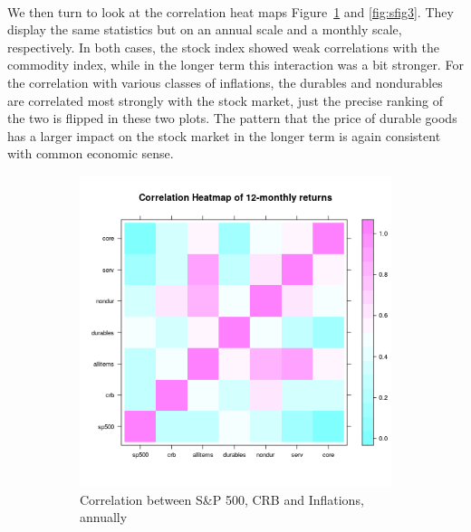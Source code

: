 \documentclass{article}
\begin{document}
\

We then turn to look at the correlation heat maps Figure~\ref{fig:sfig1} and \ref{fig:sfig3}. They display the same statistics but on an annual scale and a monthly scale, respectively. In both cases, the stock index showed weak correlations with the commodity index, while in the longer term this interaction was a bit stronger. For the correlation with various classes of inflations, the durables and nondurables are correlated most strongly with the stock market, just the precise ranking of the two is flipped in these two plots. The pattern that the price of durable goods has a larger impact on the stock market in the longer term is again consistent with common economic sense.

\begin{figure}[h!]
\begin{subfigure}{0.33\textwidth}
  \centering
  \includegraphics[width=\linewidth]{../../figures/heatmapsp500.png}
  \caption{Correlation between S\&P 500, CRB and Inflations, annually}
  \label{fig:sfig1}
\end{subfigure}%
\begin{subfigure}{0.33\textwidth}
  \centering

\end{subfigure}
\end{figure}
\end{document}
